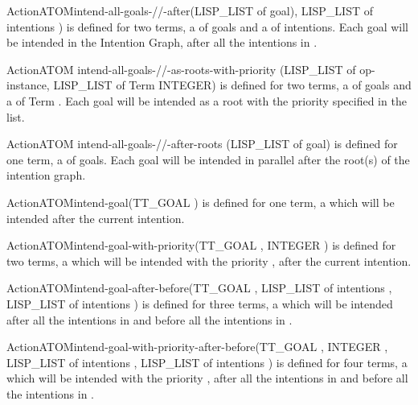 \begin{typeefa}{Action}{ATOM}{intend-all-goals-//-after}{(LISP\_LIST of goal),
LISP\_LIST of intentions )} is defined for two terms, a  of
goals and  a  of intentions. Each goal will be intended in
the Intention Graph, after all the intentions in .
\end{typeefa}

\begin{typeefa}{Action}{ATOM} {intend-all-goals-//-as-roots-with-priority}
{(LISP\_LIST of op-instance, LISP\_LIST of Term INTEGER)} is defined for two
terms, a  of goals and a  of Term .  Each goal will be
intended as a root with the priority specified in the  list.
\end{typeefa}

\begin{typeefa}{Action}{ATOM} {intend-all-goals-//-after-roots} {(LISP\_LIST of
goal)} is defined for one term, a  of goals. Each goal will be intended
in parallel after the root(s) of the intention graph.
\end{typeefa}

\begin{typeefa}{Action}{ATOM}{intend-goal}{(TT\_GOAL )}
is defined for one term, a   which will be
intended after the current intention.
\end{typeefa}

\begin{typeefa}{Action}{ATOM}{intend-goal-with-priority}{(TT\_GOAL
, INTEGER )} is defined for two terms, a  
which will be intended with the priority , after the current
intention.
\end{typeefa}

\begin{typeefa}{Action}{ATOM}{intend-goal-after-before}{(TT\_GOAL
,
LISP\_LIST of intentions , LISP\_LIST of intentions )} is
defined for three terms, a   which will be intended
after all the intentions in  and before all the intentions in
.
\end{typeefa}

\begin{typeefa}{Action}{ATOM}{intend-goal-with-priority-after-before}{(TT\_GOAL , INTEGER , LISP\_LIST of intentions ,
LISP\_LIST of intentions )}
is defined for four terms, a   which will be
intended  with the priority , after all the intentions in
 and before all the intentions in .
\end{typeefa}

